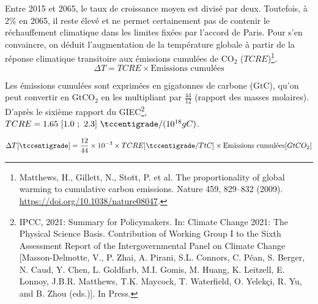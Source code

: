 \documentclass[a4,11pt]{aleph-notas}
\begin{document}
Entre 2015 et 2065, le taux de croissance moyen est divisé par deux. Toutefois, à 2\% en 2065, il reste élevé et ne permet certainement pas de contenir le réchauffement climatique dans les limites fixées par l'accord de Paris. Pour s'en convaincre, on déduit l'augmentation de la température globale à partir de la réponse climatique transitoire aux émissions cumulées de CO$_2$ ($TCRE$)\footnote{Matthews, H., Gillett, N., Stott, P. et al. The proportionality of global warming to cumulative carbon emissions. Nature 459, 829–832 (2009). \url{https://doi.org/10.1038/nature08047}.}.
\begin{equation}
    \Delta T = TCRE \times \text{Emissions cumulées}
\end{equation}

Les émissions cumulées sont exprimées en gigatonnes de carbone (GtC), qu'on peut convertir en GtCO$_2$ en les multipliant par $\frac{44}{12}$ (rapport des masses molaires). D'après le sixième rapport du GIEC\footnote{IPCC, 2021: Summary for Policymakers. In: Climate Change 2021: The Physical Science Basis. Contribution of Working Group I to the Sixth Assessment Report of the Intergovernmental Panel on Climate Change [Masson-Delmotte, V., P. Zhai, A. Pirani, S.L. Connors, C. Péan, S. Berger, N. Caud, Y. Chen, L. Goldfarb, M.I. Gomis, M. Huang, K. Leitzell, E. Lonnoy, J.B.R. Matthews, T.K. Maycock, T. Waterfield, O. Yelekçi, R. Yu, and B. Zhou (eds.)]. In Press.}, $TCRE = 1.65 ~ [1.0 ~;~ 2.3]~ \tccentigrade/(10^{18}gC)$.

\begin{equation}
    \Delta T[\tccentigrade] = \frac{12}{44} \times 10^{-3}\times TCRE[\tccentigrade/TtC] \times \text{Emissions cumulées}[GtCO_2] 
\end{equation}
\end{document}
